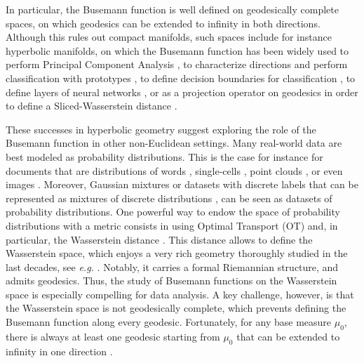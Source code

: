 \documentclass[twoside]{article}
\begin{document}
In particular, the Busemann function is well defined on geodesically complete spaces, on which geodesics can be extended to infinity in both directions. Although this rules out compact manifolds, such spaces include for instance hyperbolic manifolds, on which the Busemann function has been widely used to perform Principal Component Analysis \citep{chami2021horopca}, to characterize directions and perform classification with prototypes \citep{ghadimi2021hyperbolic, durrant2023hmsn, berg2024horospherical, berg2025multi}, to define decision boundaries for classification \citep{fan2023horospherical,doorenbos2024hyperbolic}, to define layers of neural networks \citep{wang2021laplacian, sonoda2022fully, nguyen2025neural}, or as a projection operator on geodesics in order to define a Sliced-Wasserstein distance \citep{bonet2023hyperbolic,bonet2025sliced}.

These successes in hyperbolic geometry suggest exploring the role of the Busemann function in other non-Euclidean settings. Many real-world data are best modeled as probability distributions. This is the case for instance for documents that are distributions of words \citep{kusner2015word}, single-cells \citep{bellazzi2021gene, haviv2025covariance}, point clouds \citep{haviv2025wasserstein, geuter2025ddeqs}, or even images \citep{seguy2015principal}. Moreover, Gaussian mixtures \citep{chen2018optimal, delon2020wasserstein} or datasets with discrete labels that can be represented as mixtures of discrete distributions \citep{alvarez2020geometric, bonet2025flowing}, can be seen as datasets of probability distributions. 
One powerful way to endow the space of probability distributions with a metric consists in using Optimal Transport (OT) and, in particular, the Wasserstein distance \citep{villani2009optimal}. This distance allows to define the Wasserstein space, which enjoys a very rich geometry thoroughly studied in the last decades, see \emph{e.g.} \citep{ambrosio2008gradient, villani2009optimal, santambrogio2015optimal}. Notably, it carries a formal Riemannian structure, and admits geodesics. Thus, the study of Busemann functions on the Wasserstein space is especially compelling for data analysis. A key challenge, however, is that the Wasserstein space is not geodesically complete, which prevents defining the Busemann function along every geodesic. Fortunately, for any base measure $\mu_0$, there is always at least one geodesic starting from $\mu_0$ that can be extended to infinity in one direction \citep{zhu2021busemann}. 
\end{document}
